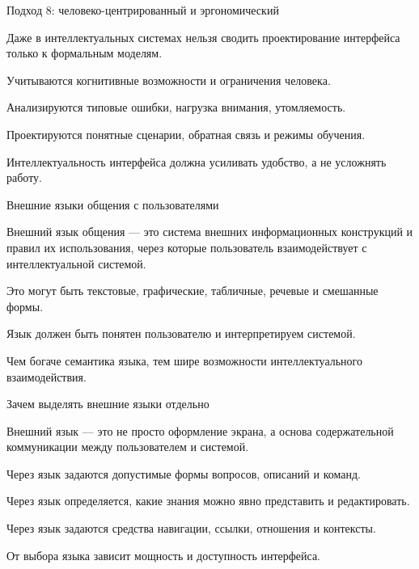 \begin{frame}{Подход 8: человеко-центрированный и эргономический}
	\topline
	\justifying

	Даже в интеллектуальных системах нельзя сводить проектирование интерфейса только к формальным моделям.
	
	\begin{textitemize}
		\item Учитываются когнитивные возможности и ограничения человека.
		\item Анализируются типовые ошибки, нагрузка внимания, утомляемость.
		\item Проектируются понятные сценарии, обратная связь и режимы обучения.
		\item Интеллектуальность интерфейса должна усиливать удобство, а не усложнять работу.
	\end{textitemize}
\end{frame}

\begin{frame}{Внешние языки общения с пользователями}
	\topline
	\justifying

	Внешний язык общения --- это система внешних информационных конструкций и правил их использования, через которые пользователь взаимодействует с интеллектуальной системой.
	
	\begin{textitemize}
		\item Это могут быть текстовые, графические, табличные, речевые и смешанные формы.
		\item Язык должен быть понятен пользователю и интерпретируем системой.
		\item Чем богаче семантика языка, тем шире возможности интеллектуального взаимодействия.
	\end{textitemize}
\end{frame}

\begin{frame}{Зачем выделять внешние языки отдельно}
	\topline
	\justifying

	Внешний язык --- это не просто оформление экрана, а основа содержательной коммуникации между пользователем и системой.
	
	\begin{textitemize}
		\item Через язык задаются допустимые формы вопросов, описаний и команд.
		\item Через язык определяется, какие знания можно явно представить и редактировать.
		\item Через язык задаются средства навигации, ссылки, отношения и контексты.
		\item От выбора языка зависит мощность и доступность интерфейса.
	\end{textitemize}
\end{frame}

